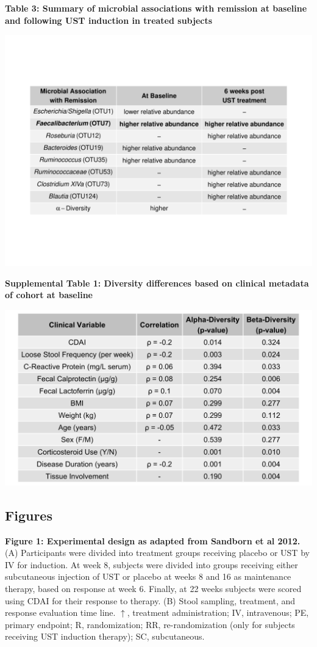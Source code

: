 \documentclass[12pt,]{article}
\begin{document}
\newpage

\textbf{Table 3: Summary of microbial associations with remission at
baseline and following UST induction in treated subjects}

\includegraphics{tables/table3_results_table.pdf}

\newpage

\textbf{Supplemental Table 1: Diversity differences based on clinical
metadata of cohort at baseline}

\includegraphics{tables/Supp.table1_cohortdiversity.png}

\newpage

\subsection{Figures}\label{figures}

\textbf{Figure 1: Experimental design as adapted from Sandborn et al
2012.} (A) Participants were divided into treatment groups receiving
placebo or UST by IV for induction. At week 8, subjects were divided
into groups receiving either subcutaneous injection of UST or placebo at
weeks 8 and 16 as maintenance therapy, based on response at week 6.
Finally, at 22 weeks subjects were scored using CDAI for their response
to therapy. (B) Stool sampling, treatment, and response evaluation time
line. \(\uparrow\), treatment administration; IV, intravenous; PE,
primary endpoint; R, randomization; RR, re-randomization (only for
subjects receiving UST induction therapy); SC, subcutaneous.
\end{document}
